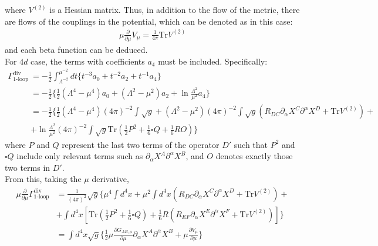 \documentclass[fleqn]{article}
\begin{document}
where $V^{(2)}$ is a Hessian matrix. Thus, in addition to the flow of the metric, there are flows of the couplings in the potential, which can be denoted as in this case:
\begin{align}
\mu \frac{\partial}{\partial \mu} V_{\mu} =\frac{1}{4\pi} \text{Tr}V^{(2)}
\end{align}
and each beta function can be deduced. \\
For $4d$ case, the terms with coefficients $a_{4}$ must be included. Specifically:
\begin{align}
\Gamma_{\text{1-loop}}^{\text{div}} &= -\frac{1}{2} \int _{\Lambda ^{-2}} ^{\mu^{-2}} dt \lbrace t^{-3} a_{0} + t^{-2} a_{2} + t^{-1} a_{4} \rbrace  \nonumber \\
&= -\frac{1}{2} \lbrace \frac{1}{2}(\Lambda ^{4} - \mu ^{4}) a_{0}+ (\Lambda ^{2} - \mu ^{2}) a_{2} + \ln \frac{\Lambda ^{2}} {\mu ^{2}} a_{4} \rbrace  \nonumber \\
&= -\frac{1}{2} \lbrace \frac{1}{2} (\Lambda ^{4} - \mu ^{4}) (4\pi)^{-2} \int \sqrt{g}+ (\Lambda ^{2} - \mu ^{2} ) (4\pi) ^{-2} \int \sqrt{g} (R_{DC} \partial _{\alpha} X^{C} \partial ^{\alpha} X^{D} + \text{Tr}V^{(2)}) + \nonumber \\
&+ \ln \frac{\Lambda ^{2}}{\mu^{2}} (4\pi)^{-2} \int \sqrt{g} \text{Tr} (\frac{1}{2} P^{2} + \frac{1}{6} \square Q + \frac{1}{6}RO) \rbrace 
\end{align}
where $P$ and $Q$ represent the last two terms of the operator $D'$ such that $P^{2}$ and $\square Q$ include only relevant terms such as $\partial _{\alpha} X^{A} \partial ^{\alpha} X^{B}$, and $O$ denotes exactly those two terms in $D'$.\\
 From this, taking the $\mu$ derivative, 
\begin{align}
\mu \frac{\partial}{\partial \mu} \Gamma _{\text{1-loop}} ^{\text{div}} & = \frac{1}{(4\pi)^{2}} \sqrt{g} \lbrace \mu ^{4} \int d^{4}x+  \mu ^{2} \int d^{4} x (R_{DC} \partial _{\alpha} X^{C} \partial ^{\alpha} X^{D} + \text{Tr}V^{(2)}) + \nonumber \\
& + \int d^{4}x [\text {Tr} (\frac{1}{2} P^{2} + \frac{1}{6} \square Q) + \frac{1}{6} R(R_{EF} \partial _{\alpha} X^{E} \partial ^{\alpha}X^{F} + \text{Tr} V^{(2)})] \rbrace  \\
& = \int d^{4} x \sqrt{g} \lbrace \frac{1}{2} \mu \frac{\partial G_{AB,\mu}}{\partial \mu} \partial _{\alpha} X^{A} \partial ^{\alpha} X^{B} + \mu \frac{\partial V_{\mu}}{\partial \mu} \rbrace 
\end{align}
\end{document}

